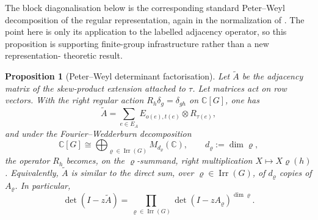 \documentclass[11pt,a4paper]{amsart}
\theoremstyle{plain}
\newtheorem{proposition}[theorem]{Proposition}
\theoremstyle{definition}
\theoremstyle{remark}
\DeclareMathOperator{\Irr}{Irr}
\newcommand{\CC}{\mathbb{C}}
\begin{document}
The block diagonalisation below is the corresponding standard Peter--Weyl
decomposition of the regular representation, again in the normalization of
\cite{Serre1977LinearRepresentations}.  The point here is only its
application to the labelled adjacency operator, so this proposition is
supporting finite-group infrastructure rather than a new representation-
theoretic result.

\begin{proposition}[Peter--Weyl determinant factorisation]
  \label{prop:kernel-peter-weyl-block-diagonalisation}
  Let \(\widetilde A\) be the adjacency matrix of the skew-product
  extension attached to \(\tau\). Let matrices act on row vectors. With
  the right regular action \(R_h\delta_g=\delta_{gh}\) on \(\CC[G]\), one
  has
  \[
    \widetilde A
    =
    \sum_{e\in E_A} E_{o(e),t(e)}\otimes R_{\tau(e)},
  \]
  and under the Fourier--Wedderburn decomposition
  \[
    \CC[G]\cong \bigoplus_{\varrho\in\Irr(G)}M_{d_\varrho}(\CC),
    \qquad d_\varrho:=\dim\varrho,
  \]
  the operator \(R_h\) becomes, on the \(\varrho\)-summand, right
  multiplication \(X\mapsto X\varrho(h)\). Equivalently, \(\widetilde A\)
  is similar to the direct sum, over \(\varrho\in\Irr(G)\), of
  \(d_\varrho\) copies of \(A_\varrho\). In particular,
  \[
    \det(I-z\widetilde A)
    =
    \prod_{\varrho\in\Irr(G)}
      \det(I-zA_\varrho)^{\dim\varrho}.
  \]
\end{proposition}
\end{document}
